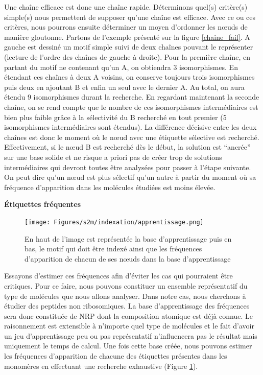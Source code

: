 Une chaîne efficace est donc une chaîne rapide.
Déterminons quel(s) critère(s) simple(s) nous permettent de supposer qu'une chaîne est efficace.
Avec ce ou ces critères, nous pourrons ensuite déterminer un moyen d'ordonner les n\oe{}uds de manière gloutonne.
Partons de l'exemple présenté sur la figure \ref{chaine_fail}.
A gauche est dessiné un motif simple suivi de deux chaînes pouvant le représenter (lecture de l'ordre des chaînes de gauche à droite).
Pour la première chaîne, en partant du motif ne contenant qu'un A, on obtiendra 3 isomorphismes.
En étendant ces chaînes à deux A voisins, on conserve toujours trois isomorphismes puis deux en ajoutant B et enfin un seul avec le dernier A.
Au total, on aura étendu 9 isomorphismes durant la recherche.
En regardant maintenant la seconde chaîne, on se rend compte que le nombre de ces isomorphismes intermédiaires est bien plus faible grâce à la sélectivité du B recherché en tout premier (5 isomorphismes intermédiaires sont étendus).
La différence décisive entre les deux chaînes est donc le moment où le n\oe{}ud avec une étiquette sélective est recherché.
Effectivement, si le n\oe{}ud B est recherché dès le début, la solution est ``ancrée'' sur une base solide et ne risque a priori pas de créer trop de solutions intermédiaires qui devront toutes être analysées pour passer à l'étape suivante.
On peut dire qu'un n\oe{}ud est plus sélectif qu'un autre à partir du moment où sa fréquence d'apparition dans les molécules étudiées est moins élevée.

\textbf{Étiquettes fréquentes}

\begin{figure}[!ht]
  \begin{center}
    \texttt{[image: Figures/s2m/indexation/apprentissage.png]}
    \caption{\label{apprentissage}En haut de l'image est représentée la base d'apprentissage puis en bas, le motif qui doit être indexé ainsi que les fréquences d'apparition de chacun de ses n\oe{}uds dans la base d'apprentissage}
  \end{center}
\end{figure}

Essayons d'estimer ces fréquences afin d'éviter les cas qui pourraient être critiques.
Pour ce faire, nous pouvons constituer un ensemble représentatif du type de molécules que nous allons analyser.
Dans notre cas, nous cherchons à étudier des peptides non ribosomiques.
La base d'apprentissage des fréquences sera donc constituée de NRP dont la composition atomique est déjà connue.
Le raisonnement est extensible à n'importe quel type de molécules et le fait d'avoir un jeu d'apprentissage peu ou pas représentatif n'influencera pas le résultat mais uniquement le temps de calcul.
Une fois cette base créée, nous pouvons estimer les fréquences d'apparition de chacune des étiquettes présentes dans les monomères en effectuant une recherche exhaustive (Figure \ref{apprentissage}).


